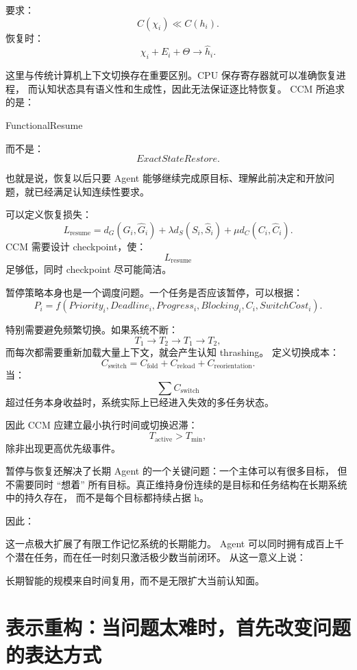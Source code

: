 要求：
\[
C(\chi_i)
\ll
C(h_i).
\]
恢复时：
\[
\chi_i
+
E_i
+
\Theta
\longrightarrow
\widehat h_i.
\]

这里与传统计算机上下文切换存在重要区别。CPU 保存寄存器就可以准确恢复进程，
而认知状态具有语义性和生成性，因此无法保证逐比特恢复。
CCM 所追求的是：
\begin{statementbox}
FunctionalResume
\end{statementbox}
而不是：
\[
ExactStateRestore.
\]

也就是说，恢复以后只要 Agent 能够继续完成原目标、理解此前决定和开放问题，就已经满足认知连续性要求。

可以定义恢复损失：
\[
L_{\mathrm{resume}}
=
d_G(G_i,\widehat G_i)
+
\lambda d_S(S_i,\widehat S_i)
+
\mu d_C(C_i,\widehat C_i).
\]
CCM 需要设计 checkpoint，使：
\[
L_{\mathrm{resume}}
\]
足够低，同时 checkpoint 尽可能简洁。

暂停策略本身也是一个调度问题。一个任务是否应该暂停，可以根据：
\[
P_i
=
f(
Priority_i,
Deadline_i,
Progress_i,
Blocking_i,
C_i,
SwitchCost_i
).
\]

特别需要避免频繁切换。如果系统不断：
\[
T_1\rightarrow T_2\rightarrow T_1\rightarrow T_2,
\]
而每次都需要重新加载大量上下文，就会产生认知 thrashing。
定义切换成本：
\[
C_{\mathrm{switch}}
=
C_{\mathrm{fold}}
+
C_{\mathrm{reload}}
+
C_{\mathrm{reorientation}}.
\]
当：
\[
\sum C_{\mathrm{switch}}
\]
超过任务本身收益时，系统实际上已经进入失效的多任务状态。

因此 CCM 应建立最小执行时间或切换迟滞：
\[
T_{\mathrm{active}}
>
T_{\min},
\]
除非出现更高优先级事件。

暂停与恢复还解决了长期 Agent 的一个关键问题：一个主体可以有很多目标，
但不需要同时 ``想着'' 所有目标。真正维持身份连续的是目标和任务结构在长期系统中的持久存在，
而不是每个目标都持续占据 h。

因此：
\begin{statementbox}
\centering
{}
\end{statementbox}

这一点极大扩展了有限工作记忆系统的长期能力。
Agent 可以同时拥有成百上千个潜在任务，而在任一时刻只激活极少数当前闭环。
从这一意义上说：
\begin{statementbox}
长期智能的规模来自时间复用，而不是无限扩大当前认知面。
\end{statementbox}


\section{表示重构：当问题太难时，首先改变问题的表达方式}

